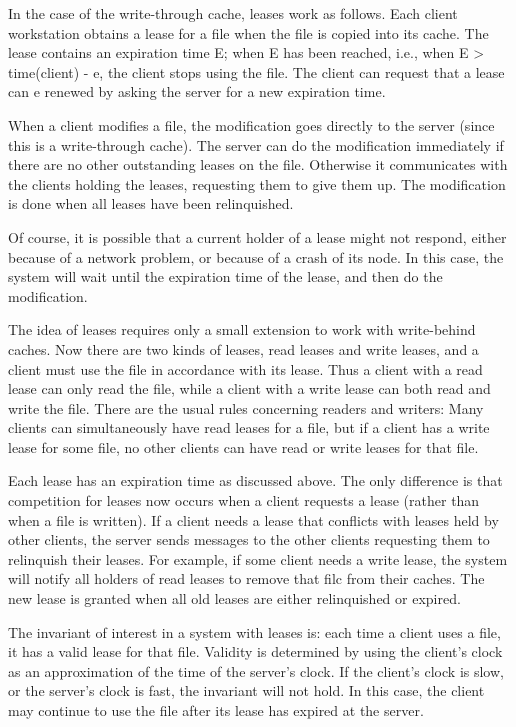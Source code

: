 \documentclass[a4paper,11pt,notitlepage,twoside,openright]{article}
\begin{document}
In the case of the write-through cache, leases work as follows. Each
client workstation obtains a lease for a file when the file is copied
into its cache. The lease contains an expiration time E; when E has been
reached, i.e., when E \textgreater{} time(client) - e, the client stops
using the file. The client can request that a lease can e renewed by
asking the server for a new expiration time.

When a client modifies a file, the modification goes directly to the
server (since this is a write-through cache). The server can do the
modification immediately if there are no other outstanding leases on the
file. Otherwise it communicates with the clients holding the leases,
requesting them to give them up. The modification is done when all
leases have been relinquished.

Of course, it is possible that a current holder of a lease might not
respond, either because of a network problem, or because of a crash of
its node. In this case, the system will wait until the expiration time
of the lease, and then do the modification.

The idea of leases requires only a small extension to work with
write-behind caches. Now there are two kinds of leases, read leases and
write leases, and a client must use the file in accordance with its
lease. Thus a client with a read lease can only read the file, while a
client with a write lease can both read and write the file. There are
the usual rules concerning readers and writers: Many clients can
simultaneously have read leases for a file, but if a client has a write
lease for some file, no other clients can have read or write leases for
that file.

Each lease has an expiration time as discussed above. The only
difference is that competition for leases now occurs when a client
requests a lease (rather than when a file is written). If a client needs
a lease that conflicts with leases held by other clients, the server
sends messages to the other clients requesting them to relinquish their
leases. For example, if some client needs a write lease, the system will
notify all holders of read leases to remove that filc from their caches.
The new lease is granted when all old leases are either relinquished or
expired.


The invariant of interest in a system with leases is: each time a client
uses a file, it has a valid lease for that file. Validity is determined
by using the client's clock as an approximation of the time of the
server's clock. If the client's clock is slow, or the server's clock is
fast, the invariant will not hold. In this case, the client may continue
to use the file after its lease has expired at the server.
\end{document}
